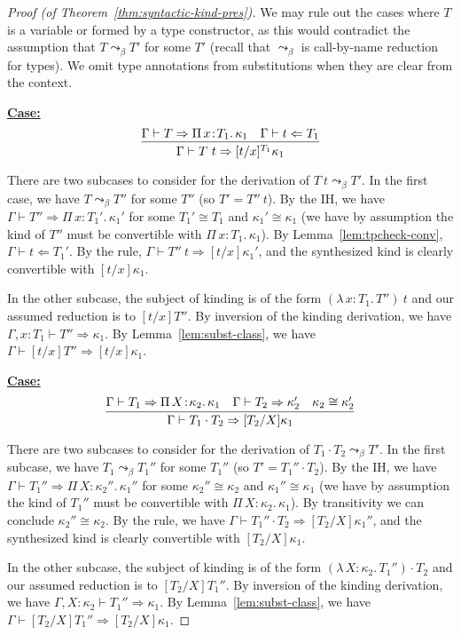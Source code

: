 \documentclass{article}
\newcommand{\abs}[4]{{#1}\, #2\! : \! #3.\, #4}
\newcommand{\tpcheck}[0]{\Leftarrow}
\newcommand{\tpsynth}[0]{\Rightarrow}
\newcommand{\startcase}[1]{\vspace{#1} \noindent\textbf{\underline{Case:}}}
\begin{document}
\begin{proof}[Proof (of Theorem~\ref{thm:syntactic-kind-pres})]
  We may rule out the cases where \(T\) is a variable or formed by a type
  constructor, as this would contradict the assumption that \(T \leadsto_{\beta}
  T'\) for some \(T'\) (recall that \(\leadsto_\beta\) is call-by-name reduction
  for types).
  We omit type annotations from substitutions when they are clear from the context.

  \startcase{.2cm}
  \[
    \infer{\Gamma\vdash T\ t \tpsynth [t/x]^{T_1}\kappa_1}{\Gamma\vdash T \tpsynth
      \abs{\Pi}{x}{T_1}{\kappa_1} & \Gamma\vdash t \tpcheck T_1}
  \]

  There are two subcases to consider for the derivation of \(T\ t \leadsto_\beta
  T'\). In the first case, we have \(T \leadsto_\beta T''\) for some \(T''\) (so
  \(T' = T''\ t\)). By the IH, we have \(\Gamma \vdash T'' \tpsynth
  \abs{\Pi}{x}{T_1'}{\kappa_1'}\) for some \(T_1' \cong T_1\) and \(\kappa_1'
  \cong \kappa_1\) (we have by assumption the kind of \(T''\) must be
  convertible with \(\abs{\Pi}{x}{T_1}{\kappa_1}\)). By
  Lemma~\ref{lem:tpcheck-conv}, \(\Gamma \vdash t \tpcheck T_1'\). By the rule,
  \(\Gamma \vdash T''\ t \tpsynth [t/x]\kappa_1'\), and the synthesized kind is
  clearly convertible with \([t/x]\kappa_1\).

  In the other subcase, the subject of kinding is of the form
  \((\abs{\lambda}{x}{T_1}{T''})\ t\) and our assumed reduction is to
  \([t/x]T''\). By inversion of the kinding derivation, we have \(\Gamma,x:T_1
  \vdash T'' \tpsynth \kappa_1\). By Lemma~\ref{lem:subst-class}, we have
  \(\Gamma \vdash [t/x]T'' \tpsynth [t/x]\kappa_1\).

  \startcase{.2cm}
  \[
    \infer{\Gamma\vdash T_1 \cdot T_2 \tpsynth [T_2/X]\kappa_1}{\Gamma\vdash T_1
      \tpsynth \abs{\Pi}{X}{\kappa_2}{\kappa_1} & \Gamma\vdash T_2 \tpsynth
      \kappa_2' & \kappa_2 \cong \kappa_2'}
  \]

  There are two subcases to consider for the derivation of \(T_1 \cdot T_2
  \leadsto_\beta T'\). In the first subcase, we have \(T_1 \leadsto_\beta
  T_1''\) for some \(T_1''\) (so \(T' = T_1'' \cdot T_2\)). By the IH, we have
  \(\Gamma \vdash T_1'' \tpsynth \abs{\Pi}{X}{\kappa_2''}{\kappa_1''}\) for some
  \(\kappa_2'' \cong \kappa_2\) and \(\kappa_1'' \cong \kappa_1\) (we have by
  assumption the kind of \(T_1''\) must be convertible with
  \(\abs{\Pi}{X}{\kappa_2}{\kappa_1}\)). By transitivity we can conclude
  \(\kappa_2'' \cong \kappa_2\). By the rule, we have \(\Gamma \vdash T_1''
  \cdot T_2 \tpsynth [T_2/X]\kappa_1''\), and the synthesized kind is clearly
  convertible with \([T_2/X]\kappa_1\).

  In the other subcase, the subject of kinding is of the form
  \((\abs{\lambda}{X}{\kappa_2}{T_1''}) \cdot T_2\) and our assumed reduction is
  to \([T_2/X]T_1''\). By inversion of the kinding derivation, we have
  \(\Gamma,X:\kappa_2 \vdash T_1'' \tpsynth \kappa_1\). By
  Lemma~\ref{lem:subst-class}, we have \(\Gamma \vdash [T_2/X]T_1'' \tpsynth
  [T_2/X]\kappa_1\).
\end{proof}
\end{document}
